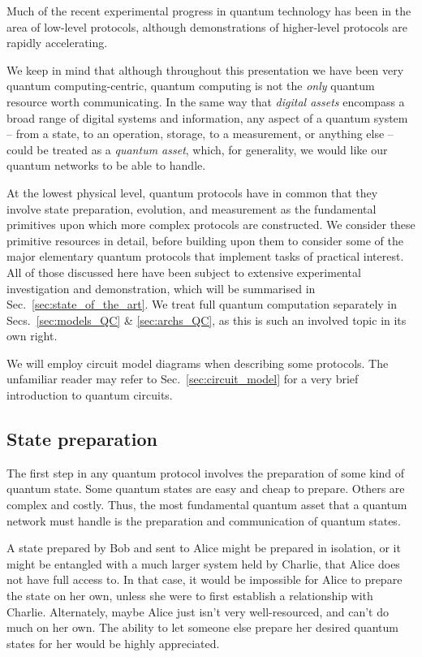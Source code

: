 \documentclass[aps,rmp,twocolumn,amsmath,amssymb,nofootinbib,superscriptaddress,longbibliography,floatfix,table-of-contents,eqsecnum]{revtex4-1}
\begin{document}
Much of the recent experimental progress in quantum technology has been in the area of low-level protocols, although demonstrations of higher-level protocols are rapidly accelerating.

We keep in mind that although throughout this presentation we have been very quantum computing-centric, quantum computing is not the \textit{only} quantum resource worth communicating. In the same way that \textit{digital assets} encompass a broad range of digital systems and information, any aspect of a quantum system -- from a state, to an operation, storage, to a measurement, or anything else -- could be treated as a \textit{quantum asset}, which, for generality, we would like our quantum networks to be able to handle.

At the lowest physical level, quantum protocols have in common that they involve state preparation, evolution, and measurement as the fundamental primitives upon which more complex protocols are constructed. We consider these primitive resources in detail, before building upon them to consider some of the major elementary quantum protocols that implement tasks of practical interest. All of those discussed here have been subject to extensive experimental investigation and demonstration, which will be summarised in Sec.~\ref{sec:state_of_the_art}. We treat full quantum computation separately in Secs.~\ref{sec:models_QC} \& \ref{sec:archs_QC}, as this is such an involved topic in its own right.

We will employ circuit model diagrams when describing some protocols. The unfamiliar reader may refer to Sec.~\ref{sec:circuit_model} for a very brief introduction to quantum circuits.

%
%

\subsection{State preparation} 

The first step in any quantum protocol involves the preparation of some kind of quantum state. Some quantum states are easy and cheap to prepare. Others are complex and costly. Thus, the most fundamental quantum asset that a quantum network must handle is the preparation and communication of quantum states.

A state prepared by Bob and sent to Alice might be prepared in isolation, or it might be entangled with a much larger system held by Charlie, that Alice does not have full access to. In that case, it would be impossible for Alice to prepare the state on her own, unless she were to first establish a relationship with Charlie. Alternately, maybe Alice just isn't very well-resourced, and can't do much on her own. The ability to let someone else prepare her desired quantum states for her would be highly appreciated.
\end{document}
